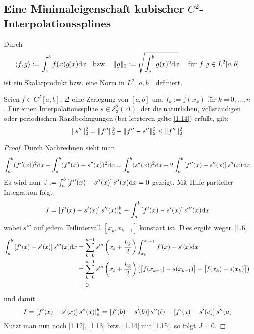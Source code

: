 \subsection{Eine Minimaleigenschaft kubischer $C^2$-Interpolationssplines}

Durch
\begin{align}
	\left\langle f,g\right\rangle:= \int_a^b f(x)g(x)\mathrm{d} x\quad\text{bzw.}\quad\Vert g\Vert_2:=\sqrt{\int_a^b g(x)^2\mathrm{d} x} \quad\text{ für } f,g\in L^2[a,b]\notag
\end{align}
ist ein Skalarprodukt bzw. eine Norm in $L^2[a,b]$ definiert.

\begin{proposition}
	Seien $f\in C^2[a,b]$, $\Delta$ eine Zerlegung von $[a,b]$ und $f_k:=f(x_k)$ für $k=0,...,n$. Für einen Interpolationsspline $s\in\mathcal{S}^2_3(\Delta)$, der die natürlichen, vollständigen oder periodischen Randbedingungen (bei letzteren gelte \cref{1.14}) erfüllt, gilt:
	\begin{align}
		\Vert s''\Vert^2_2 = \Vert f''\Vert_2^2 - \Vert f''-s''\Vert_2^2 \le \Vert f''\Vert_2^2\notag
	\end{align}
\end{proposition}
\begin{proof}
	Durch Nachrechnen sieht man
	\begin{align}
		\int_a^b (f''(x))^2\mathrm{d} x-\int_a^b (f''(x)-s''(x))^2\mathrm{d} x = \int_a^b (s''(x))^2\mathrm{d} x + 2\int_a^b \left[ f''(x)-s''(x)\right] s''(x)\mathrm{d} x \notag
	\end{align}
	Es wird nun $J:=\int_a^b \left[ f''(x)-s''(x)\right] s''(x)\mathrm{d} x=0$ gezeigt. Mit Hilfe partieller Integration folgt
	\begin{align}
		J=\left[ f'(x)-s'(x)\right] s''(x)\vert_a^b - \int_a^b \left[ f'(x)-s'(x)\right] s'''(x)\mathrm{d} x\notag
	\end{align}
	wobei $s'''$ auf jedem Teilintervall $[x_k,x_{k+1}]$ konstant ist. Dies ergibt wegen \cref{1.6}
	\begin{align}
		\int_a^b \left[ f'(x)-s'(x)\right] s'''(x)\mathrm{d} x &= \sum_{k=0}^{n-1} s'''\left(x_k+\frac{h_k}{2}\right)\int_{x_k}^{x_{x+1}}f'(x)-s'(x)\mathrm{d} x \notag \\
		&= \sum_{k=0}^{n-1} s'''\left(x_k+\frac{h_k}{2}\right)\big(\big[f(x_{k+1})-s(x_{k+1})\big]-\big[f(x_k)-s(x_k)\big]\big) \notag \\
		&= 0 \notag
	\end{align}
	und damit 
	\begin{align}
		J=\left[ f'(x)-s'(x)\right] s''(x)\vert_a^b = \left[ f'(b)-s'(b)\right] s''(b)-\left[ f'(a)-s'(a)\right] s''(a)\notag
	\end{align}
	Nutzt man nun noch \cref{1.12}, \cref{1.13} bzw. \cref{1.14} mit \cref{1.15}, so folgt $J=0$.
\end{proof}

